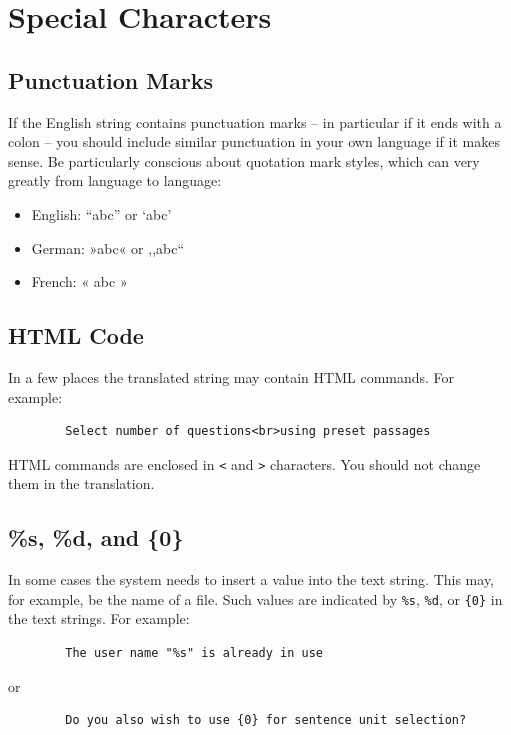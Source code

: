 \documentclass[11pt,oneside,a4paper]{memoir}
\begin{document}
\section{Special Characters}

\subsection{Punctuation Marks}

If the English string contains punctuation marks -- in particular if it ends with a colon -- you should
include similar punctuation in your own language if it makes sense. Be particularly conscious about
quotation mark styles, which can very greatly from language to language:

\begin{itemize}
\item[] English: ``abc'' or `abc'
\item[] German: »abc« or ,,abc``
\item[] French: « abc »
\end{itemize}


\subsection{HTML Code}

In a few places the translated string may contain HTML commands. For example:

\begin{verbatim}
        Select number of questions<br>using preset passages
\end{verbatim}

HTML commands are enclosed in \verb|<| and \verb|>| characters. You should not change them in the
translation.

\subsection{\%s, \%d, and \{0\}}

In some cases the system needs to insert a value into the text string. This may, for example, be the
name of a file. Such values are indicated by \verb|%s|, \verb|%d|, or \verb|{0}| in the text
strings. For example:

\begin{verbatim}
        The user name "%s" is already in use
\end{verbatim}

\noindent or
\begin{verbatim}
        Do you also wish to use {0} for sentence unit selection?
\end{verbatim}
\end{document}

